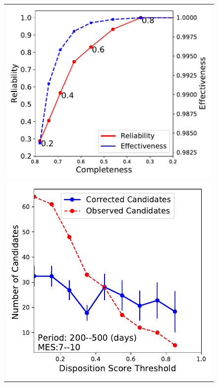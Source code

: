 \begin{figure}[htb]
 \begin{center}
 \begin{tabular}{c}
   \includegraphics[width=\linewidth]{f13-top.pdf} \\[2pt]
  \includegraphics[width=\linewidth]{f13-bottom.pdf}

\end{tabular}
\end{center}
\end{figure}
